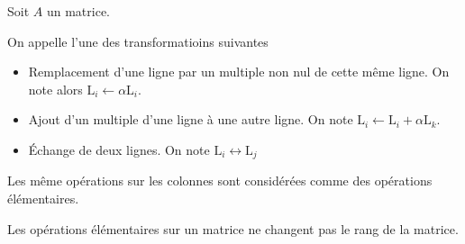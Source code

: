 \begin{dfn}
Soit $A$ un matrice.

On appelle  l'une des transformatioins
suivantes
\begin{itemize}
    \item Remplacement d'une ligne par un multiple non nul de cette même
    ligne. On note alors $\mathrm{L}_i \gets \alpha \mathrm{L}_i$.
    \item Ajout d'un multiple d'une ligne à une autre ligne.
    On note $\mathrm{L}_i \gets \mathrm{L}_i + \alpha \mathrm{L}_k$.
    \item \'Echange de deux lignes. On note $\mathrm{L}_i \leftrightarrow
    \mathrm{L}_j$
\end{itemize}
Les même opérations sur les colonnes sont considérées comme des
opérations élémentaires.
\end{dfn}

\begin{prp}
Les opérations élémentaires sur un matrice ne changent pas le rang de la
matrice.
\end{prp}



